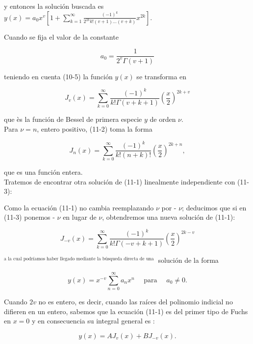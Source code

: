 \documentclass[10pt]{article}
\theoremstyle{plain}
\theoremstyle{definition}
\theoremstyle{remark}
\begin{document}
y entonces la solución buscada es\\
$y(x)=a_{0} x^{v}\left[1+\sum_{k=1}^{\infty} \frac{(-1)^{k}}{2^{2 k} k!(v+1) \ldots(v+k)} x^{2 k}\right]$.

Cuando se fija el valor de la constante

$$
a_{0}=\frac{1}{2^{v} \Gamma(v+1)}
$$

teniendo en cuenta (10-5) la función $y(x)$ se transforma en


\begin{equation*}
J_{v}(x)=\sum_{k=0}^{\infty} \frac{(-1)^{k}}{k!\Gamma(v+k+1)}\left(\frac{x}{2}\right)^{2 k+v} \tag{11-3}
\end{equation*}


que ès la función de Bessel de primera especie $y$ de orden $\nu$.\\
Para $\nu=n$, entero positivo, (11-2) toma la forma


\begin{equation*}
J_{n}(x)=\sum_{k=0}^{\infty} \frac{(-1)^{k}}{k!(n+k)!}\left(\frac{x}{2}\right)^{2 k+n}, \tag{11-3’}
\end{equation*}


que es una función entera.\\
Tratemos de encontrar otra solución de (11-1) linealmente independiente con (11-3):

Como la ecuación (11-1) no cambia reemplazando $\nu$ por - $\nu$; deducimos que si en (11-3) ponemos - $\nu$ en lugar de $\nu$, obtendremos una nueva solución de (11-1):


\begin{equation*}
J_{-v}(x)=\sum_{k=0}^{\infty} \frac{(-1)^{k}}{k!\Gamma(-v+k+1)}\left(\frac{x}{2}\right)^{2 k-v} \tag{11-4}
\end{equation*}


${ }^{\text {a la cual podríamos haber llegado mediante la búsqueda directa de una }}$ solución de la forma

$$
y(x)=x^{-v} \sum_{n=0}^{\infty} a_{n} x^{n} \quad \text { para } \quad a_{0} \neq 0 .
$$

Cuando $2 v$ no es entero, es decir, cuando las raíces del polinomio indicial no difieren en un entero, sabemos que la ecuación (11-1) es del primer tipo de Fuchs en $x=0$ y en consecuencia su integral general es :


\begin{equation*}
y(x)=A J_{v}(x)+B J_{-v}(x) . \tag{11-5}
\end{equation*}
\end{document}
